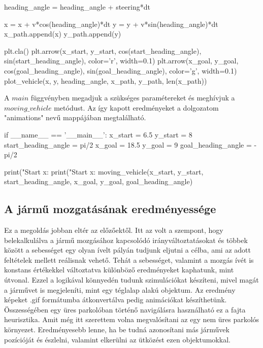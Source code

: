 \begin{python}
 	heading_angle = heading_angle + steering*dt

        x = x + v*cos(heading_angle)*dt
        y = y + v*sin(heading_angle)*dt
        x_path.append(x)
        y_path.append(y)

        plt.cla()
        plt.arrow(x_start, y_start, cos(start_heading_angle),
                  sin(start_heading_angle), color='r', width=0.1)
        plt.arrow(x_goal, y_goal, cos(goal_heading_angle),
                  sin(goal_heading_angle), color='g', width=0.1)
        plot_vehicle(x, y, heading_angle, x_path, y_path, len(x_path))
\end{python}

A $ main $ függvényben megadjuk a szükséges paramétereket és meghívjuk a \\ $ moving\_vehicle $ metódust. Az így kapott eredményeket a dolgozatom "animations" nevű mappájában megtalálható.

\begin{python}
if __name__ == '__main__':
    x_start = 6.5
    y_start = 8
    start_heading_angle = pi/2
    x_goal = 18.5
    y_goal = 9
    goal_heading_angle = -pi/2

    print("Start x: %
    print("Start x: %
    moving_vehicle(x_start, y_start, start_heading_angle, x_goal,
     y_goal, goal_heading_angle)
\end{python}

\subsection{A jármű mozgatásának eredményessége}
Ez a megoldás jobban eltér az előzőektől. Itt az volt a szempont, hogy belekalkulálva a jármű mozgásához kapcsolódó irányváltoztatásokat és többek között a sebességet egy olyan ívelt pályán tudjunk eljutni a célba, ami az adott feltételek mellett reálisnak vehető. Tehát a sebességet, valamint a mozgás ívét is konstans értékekkel változtatva különböző eredményeket kaphatunk, mint útvonal. Ezzel a logikával könnyedén tudunk szimulációkat készíteni, mivel magát a járművet is megjeleníti, mint egy téglalap alakú objektum. Az eredmény képeket .gif formátumba átkonvertálva pedig animációkat készíthetünk. Összességében egy üres parkolóban történő navigálásra használható ez a fajta heurisztika. Amit még itt szerettem volna megvalósítani az egy nem üres parkolós környezet. Eredményesebb lenne, ha be tudná azonosítani más járművek pozícióját és észlelni, valamint elkerülni az ütközést ezen objektumokkal. 
